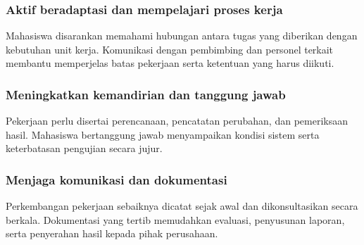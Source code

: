 \subsubsection{Aktif beradaptasi dan mempelajari proses kerja}

Mahasiswa disarankan memahami hubungan antara tugas yang diberikan dengan kebutuhan unit kerja. Komunikasi dengan pembimbing dan personel terkait membantu memperjelas batas pekerjaan serta ketentuan yang harus diikuti.

\subsubsection{Meningkatkan kemandirian dan tanggung jawab}

Pekerjaan perlu disertai perencanaan, pencatatan perubahan, dan pemeriksaan hasil. Mahasiswa bertanggung jawab menyampaikan kondisi sistem serta keterbatasan pengujian secara jujur.

\subsubsection{Menjaga komunikasi dan dokumentasi}

Perkembangan pekerjaan sebaiknya dicatat sejak awal dan dikonsultasikan secara berkala. Dokumentasi yang tertib memudahkan evaluasi, penyusunan laporan, serta penyerahan hasil kepada pihak perusahaan.

\endgroup
